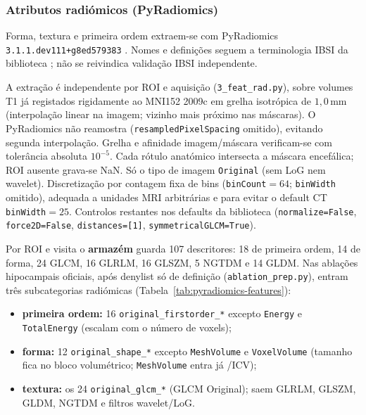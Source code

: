 \documentclass[review]{elsarticle}
\newcommand{\code}[1]{\texttt{#1}}
\begin{document}
		\subsubsection{Atributos radiómicos (PyRadiomics)}\label{subsubsec:radiomics}

			Forma, textura e primeira ordem extraem-se com PyRadiomics \code{3.1.1.dev111+g8ed579383} \cite{griethuysen-2017}.
			Nomes e definições seguem a terminologia IBSI da biblioteca \cite{zwanenburg-2020}; não se reivindica validação IBSI independente.
			
			A extração é independente por ROI e aquisição (\code{3\_feat\_rad.py}), sobre volumes T1 já registados rigidamente ao MNI152 2009c em grelha isotrópica de $1{,}0$\,mm (interpolação linear na imagem; vizinho mais próximo nas máscaras).
			O PyRadiomics não reamostra (\code{resampledPixelSpacing} omitido), evitando segunda interpolação.
			Grelha e afinidade imagem/máscara verificam-se com tolerância absoluta \(10^{-5}\).
			Cada rótulo anatómico intersecta a máscara encefálica; ROI ausente grava-se NaN.
			Só o tipo de imagem \code{Original} (sem LoG nem wavelet).
			Discretização por contagem fixa de bins (\code{binCount}$=64$; \code{binWidth} omitido), adequada a unidades MRI arbitrárias e para evitar o default CT \code{binWidth}$=25$.
			Controlos restantes nos defaults da biblioteca (\code{normalize=False}, \code{force2D=False}, \code{distances=[1]}, \code{symmetricalGLCM=True}).
			
			Por ROI e visita o \textbf{armazém} guarda 107 descritores: 18 de primeira ordem, 14 de forma, 24 GLCM, 16 GLRLM, 16 GLSZM, 5 NGTDM e 14 GLDM.
			Nas ablações hipocampais oficiais, após denylist só de definição (\code{ablation\_prep.py}), entram três subcategorias radiómicas (Tabela~\ref{tab:pyradiomics-features}):
			
			\begin{itemize}
				\item \textbf{primeira ordem:} 16 \code{original\_firstorder\_*} excepto \code{Energy} e \code{TotalEnergy} (escalam com o número de voxels);
				
				\item \textbf{forma:} 12 \code{original\_shape\_*} excepto \code{MeshVolume} e \code{VoxelVolume} (tamanho fica no bloco volumétrico; \code{MeshVolume} entra já /ICV);
				
				\item \textbf{textura:} os 24 \code{original\_glcm\_*} (GLCM Original); saem GLRLM, GLSZM, GLDM, NGTDM e filtros wavelet/LoG.
			\end{itemize}
			
\end{document}
